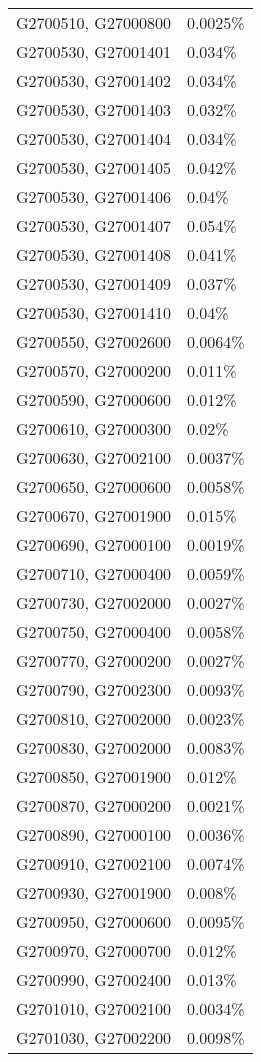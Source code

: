 \begin{longtable}[]{@{}ll@{}}
G2700510, G27000800 & 0.0025\% \\
G2700530, G27001401 & 0.034\% \\
G2700530, G27001402 & 0.034\% \\
G2700530, G27001403 & 0.032\% \\
G2700530, G27001404 & 0.034\% \\
G2700530, G27001405 & 0.042\% \\
G2700530, G27001406 & 0.04\% \\
G2700530, G27001407 & 0.054\% \\
G2700530, G27001408 & 0.041\% \\
G2700530, G27001409 & 0.037\% \\
G2700530, G27001410 & 0.04\% \\
G2700550, G27002600 & 0.0064\% \\
G2700570, G27000200 & 0.011\% \\
G2700590, G27000600 & 0.012\% \\
G2700610, G27000300 & 0.02\% \\
G2700630, G27002100 & 0.0037\% \\
G2700650, G27000600 & 0.0058\% \\
G2700670, G27001900 & 0.015\% \\
G2700690, G27000100 & 0.0019\% \\
G2700710, G27000400 & 0.0059\% \\
G2700730, G27002000 & 0.0027\% \\
G2700750, G27000400 & 0.0058\% \\
G2700770, G27000200 & 0.0027\% \\
G2700790, G27002300 & 0.0093\% \\
G2700810, G27002000 & 0.0023\% \\
G2700830, G27002000 & 0.0083\% \\
G2700850, G27001900 & 0.012\% \\
G2700870, G27000200 & 0.0021\% \\
G2700890, G27000100 & 0.0036\% \\
G2700910, G27002100 & 0.0074\% \\
G2700930, G27001900 & 0.008\% \\
G2700950, G27000600 & 0.0095\% \\
G2700970, G27000700 & 0.012\% \\
G2700990, G27002400 & 0.013\% \\
G2701010, G27002100 & 0.0034\% \\
G2701030, G27002200 & 0.0098\% \\

\end{longtable}
